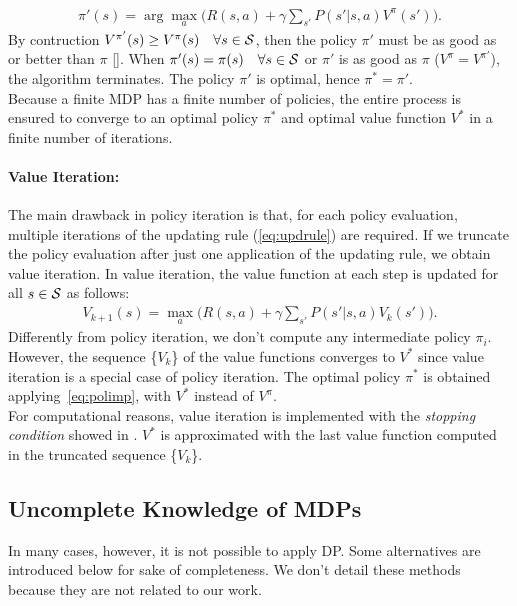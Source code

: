 \begin{align} 
\pi'(s) = \arg \max_{a} \Big( R(s,a) + \gamma \sum_{s'} P(s'|s,a)  V^{\pi}(s') \Big). \label{eq:polimp}
\end{align}
By contruction $V^{\pi'}(s) \geq V^{\pi}(s) \quad \forall s \in \mathcal{S}$, then the policy $\pi'$ must be as good as or better than $\pi$ [\cite{sutton2018reinforcement}].
When $\pi'(s) = \pi(s) \quad \forall s \in \mathcal{S}$ or $\pi'$ is as good as $\pi$ (\ie $V^{\pi} = V^{\pi'}$), the algorithm terminates. The policy $\pi'$ is optimal, hence $\pi^{*} = \pi'$.\\
\newline
Because a finite \ac{MDP} has a finite number of policies, the entire process is ensured to converge to an optimal policy $\pi^{*}$ and optimal value function $V^{*}$ in a finite number of iterations.
\paragraph{Value Iteration:} \label{subsec:vi}
The main drawback in policy iteration is that, for each policy evaluation, multiple iterations of the updating rule (\ref{eq:updrule}) are required. If we truncate the policy evaluation after just one application of the updating rule, we obtain value iteration. In value iteration, the value function at each step is updated for all $s \in \mathcal{S}$ as follows:
\begin{align} V_{k+1}(s) = \max_a \Big( R(s,a) + \gamma \sum_{s'}P(s'|s,a)  V_{k}(s') \Big). \end{align}
Differently from policy iteration, we don't compute any intermediate policy $\pi_i$. However, the sequence \{$V_{k}$\} of the value functions converges to $V^{*}$ since value iteration is a special case of policy iteration. The optimal policy $\pi^{*}$ is obtained applying~\eqref{eq:polimp}, with $V^{*}$ instead of $V^{\pi}$.\\
\newline
For computational reasons, value iteration is implemented with the \emph{stopping condition} showed in . $V^{*}$ is approximated with the last value function computed in the truncated sequence \{$V_{k}$\}.

\subsection{Uncomplete Knowledge of \ac{MDPs}}
In many cases, however, it is not possible to apply \ac{DP}. Some alternatives are introduced below for sake of completeness. We don't detail these methods because they are not related to our work.  

